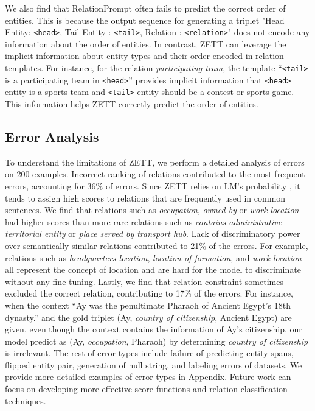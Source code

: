{We also find that RelationPrompt often fails to predict the correct order of entities. This is because the output sequence for generating a triplet "Head Entity: \texttt{<head>}, Tail Entity : \texttt{<tail>}, Relation : \texttt{<relation>}" does not encode any information about the order of entities. In contrast, ZETT can leverage the implicit information about entity types and their order encoded in relation templates. For instance, for the relation \textit{participating team}, the template ``\texttt{<tail>} is a participating team in \texttt{<head>}'' provides implicit information that \texttt{<head>} entity is a sports team and \texttt{<tail>} entity should be a contest or sports game. This information helps ZETT correctly predict the order of entities.}

\subsection{Error Analysis}
\label{sec:error_analysis}

To understand the limitations of ZETT, we perform a detailed analysis of errors on 200 examples. Incorrect ranking of relations contributed to the most frequent errors, accounting for 36\% of errors. Since ZETT relies on LM's probability , it tends to assign high scores to relations that are frequently used in common sentences. We find that relations such as \textit{occupation}, \textit{owned by} or \textit{work location} had higher scores than more rare relations such as \textit{contains administrative territorial entity} or \textit{place served by transport hub}.
Lack of discriminatory power over semantically similar relations contributed to 21\% of the errors. For example, relations such as \textit{headquarters location}, \textit{location of formation}, and \textit{work location}\, all represent the concept of location and are hard for the model to discriminate without any fine-tuning.
Lastly, we find that relation constraint sometimes excluded the correct relation, contributing to 17\% of the errors. For instance, when the context ``Ay was the penultimate Pharaoh of Ancient Egypt's 18th dynasty.'' and the gold triplet (Ay, \textit{country of citizenship}, Ancient Egypt) are given, even though the context contains the information of Ay's citizenship, our model predict as (Ay,	\textit{occupation}, Pharaoh) by determining \textit{country of citizenship} is irrelevant.
The rest of error types include failure of predicting entity spans, flipped entity pair, generation of null string, and labeling errors of datasets. We provide more detailed examples of error types in Appendix. Future work can focus on developing more effective score functions and relation classification techniques.

